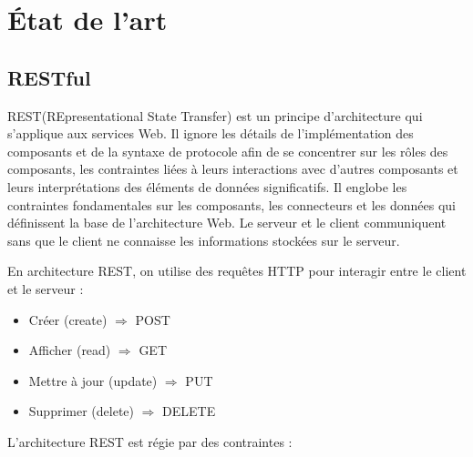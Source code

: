 \chapter{État de l'art}

\section{RESTful}

REST(REpresentational State Transfer) \cite{Fie00} est un principe d'architecture qui s'applique aux services Web. Il ignore les détails de l'implémentation des composants et de la syntaxe de protocole afin de se concentrer sur les rôles des composants, les contraintes liées à leurs interactions avec d'autres composants et leurs interprétations des éléments de données significatifs. Il englobe les contraintes fondamentales sur les composants, les connecteurs et les données qui définissent la base de l'architecture Web. Le serveur et le client communiquent sans que le client ne connaisse les informations stockées sur le serveur.
\newline

\noindent
En architecture REST, on utilise des requêtes HTTP pour interagir entre le client et le serveur :
\begin{itemize}
    \item Créer (create) $\Rightarrow$ POST
    \item Afficher (read) $\Rightarrow$ GET
    \item Mettre à jour (update) $\Rightarrow$ PUT
    \item Supprimer (delete) $\Rightarrow$ DELETE
\end{itemize}

\noindent
L'architecture REST est régie par des contraintes :

